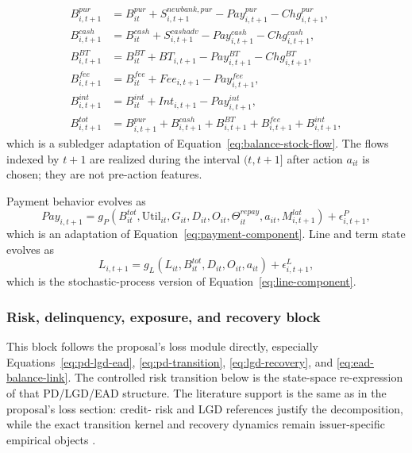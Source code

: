 \documentclass[11pt]{article}
\newcommand{\1}{\mathbf{1}}
\begin{document}
\begin{align}
  B^{pur}_{i,t+1}
    &= B^{pur}_{it} + S^{newbank,pur}_{i,t+1} - Pay^{pur}_{i,t+1}
       - Chg^{pur}_{i,t+1},
       \label{eq:ss-balance-pur}\\
  B^{cash}_{i,t+1}
    &= B^{cash}_{it} + S^{cashadv}_{i,t+1} - Pay^{cash}_{i,t+1}
       - Chg^{cash}_{i,t+1},
       \label{eq:ss-balance-cash}\\
  B^{BT}_{i,t+1}
    &= B^{BT}_{it} + BT_{i,t+1} - Pay^{BT}_{i,t+1}
       - Chg^{BT}_{i,t+1},
       \label{eq:ss-balance-bt}\\
  B^{fee}_{i,t+1}
    &= B^{fee}_{it} + Fee_{i,t+1} - Pay^{fee}_{i,t+1},
       \label{eq:ss-balance-fee}\\
  B^{int}_{i,t+1}
    &= B^{int}_{it} + Int_{i,t+1} - Pay^{int}_{i,t+1},
       \label{eq:ss-balance-int}\\
  B^{tot}_{i,t+1}
    &= B^{pur}_{i,t+1}+B^{cash}_{i,t+1}+B^{BT}_{i,t+1}
       +B^{fee}_{i,t+1}+B^{int}_{i,t+1},
       \label{eq:ss-balance-total}
\end{align}
which is a subledger adaptation of Equation~\eqref{eq:balance-stock-flow}. The
flows indexed by $t+1$ are realized during the interval $(t,t+1]$ after action
$a_{it}$ is chosen; they are not pre-action features.

Payment behavior evolves as
\begin{equation}
  Pay_{i,t+1}
  =
  g_P(B^{tot}_{it},\mathrm{Util}_{it},G_{it},D_{it},O_{it},\Theta^{repay}_{it},a_{it},M^{lat}_{i,t+1})
  + \epsilon^P_{i,t+1},
  \label{eq:ss-payment-transition}
\end{equation}
which is an adaptation of Equation~\eqref{eq:payment-component}. Line and term
state evolves as
\begin{equation}
  L_{i,t+1}
  =
  g_L(L_{it},B^{tot}_{it},D_{it},O_{it},a_{it}) + \epsilon^L_{i,t+1},
  \label{eq:ss-line-transition}
\end{equation}
which is the stochastic-process version of Equation~\eqref{eq:line-component}.

\subsubsection{Risk, delinquency, exposure, and recovery block}
\label{subsec:state-space-risk-block}

This block follows the proposal's loss module directly, especially
Equations~\eqref{eq:pd-lgd-ead}, \eqref{eq:pd-transition},
\eqref{eq:lgd-recovery}, and \eqref{eq:ead-balance-link}. The controlled risk
transition below is the state-space re-expression of that PD/LGD/EAD structure.
The literature support is the same as in the proposal's loss section: credit-
risk and LGD references justify the decomposition, while the exact transition
kernel and recovery dynamics remain issuer-specific empirical objects
\citep{hand1997credit,thomas2000survey,lessmann2015benchmarking,
schuermann2004lgd}.
\end{document}

